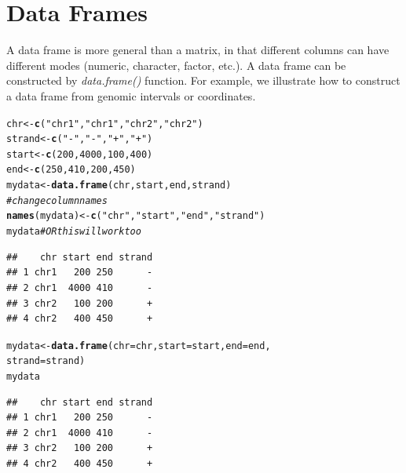 \documentclass[english,nohyper]{tufte-book}\usepackage[]{graphicx}\usepackage[]{color}
\makeatletter
\newcommand{\hlnum}[1]{\textcolor[rgb]{0.686,0.059,0.569}{#1}}%
\newcommand{\hlstr}[1]{\textcolor[rgb]{0.192,0.494,0.8}{#1}}%
\newcommand{\hlcom}[1]{\textcolor[rgb]{0.678,0.584,0.686}{\textit{#1}}}%
\newcommand{\hlstd}[1]{\textcolor[rgb]{0.345,0.345,0.345}{#1}}%
\newcommand{\hlkwb}[1]{\textcolor[rgb]{0.69,0.353,0.396}{#1}}%
\newcommand{\hlkwc}[1]{\textcolor[rgb]{0.333,0.667,0.333}{#1}}%
\newcommand{\hlkwd}[1]{\textcolor[rgb]{0.737,0.353,0.396}{\textbf{#1}}}%
\newenvironment{kframe}{%
 \def\at@end@of@kframe{}%
 \ifinner\ifhmode%
  \def\at@end@of@kframe{\end{minipage}}%
  \begin{minipage}{\columnwidth}%
 \fi\fi%
 \def\FrameCommand##1{\hskip\@totalleftmargin \hskip-\fboxsep
 \colorbox{shadecolor}{##1}\hskip-\fboxsep
     \hskip-\linewidth \hskip-\@totalleftmargin \hskip\columnwidth}%
 \MakeFramed {\advance\hsize-\width
   \@totalleftmargin\z@ \linewidth\hsize
   \@setminipage}}%
 {\par\unskip\endMakeFramed%
 \at@end@of@kframe}
\newenvironment{knitrout}{}{} %
\makeatother
\begin{document}
\section{Data Frames}

A data frame is more general than a matrix, in that different columns
can have different modes (numeric, character, factor, etc.). A data
frame can be constructed by \emph{data.frame()} function. For example,
we illustrate how to construct a data frame from genomic intervals
or coordinates.

\begin{knitrout}
\color{fgcolor}\begin{kframe}
\begin{alltt}
\hlstd{chr} \hlkwb{<-} \hlkwd{c}\hlstd{(}\hlstr{"chr1"}\hlstd{,} \hlstr{"chr1"}\hlstd{,} \hlstr{"chr2"}\hlstd{,} \hlstr{"chr2"}\hlstd{)}
\hlstd{strand} \hlkwb{<-} \hlkwd{c}\hlstd{(}\hlstr{"-"}\hlstd{,} \hlstr{"-"}\hlstd{,} \hlstr{"+"}\hlstd{,} \hlstr{"+"}\hlstd{)}
\hlstd{start} \hlkwb{<-} \hlkwd{c}\hlstd{(}\hlnum{200}\hlstd{,} \hlnum{4000}\hlstd{,} \hlnum{100}\hlstd{,} \hlnum{400}\hlstd{)}
\hlstd{end} \hlkwb{<-} \hlkwd{c}\hlstd{(}\hlnum{250}\hlstd{,} \hlnum{410}\hlstd{,} \hlnum{200}\hlstd{,} \hlnum{450}\hlstd{)}
\hlstd{mydata} \hlkwb{<-} \hlkwd{data.frame}\hlstd{(chr, start, end, strand)}
\hlcom{# change column names}
\hlkwd{names}\hlstd{(mydata)} \hlkwb{<-} \hlkwd{c}\hlstd{(}\hlstr{"chr"}\hlstd{,} \hlstr{"start"}\hlstd{,} \hlstr{"end"}\hlstd{,} \hlstr{"strand"}\hlstd{)}
\hlstd{mydata}  \hlcom{# OR this will work too }
\end{alltt}
\begin{verbatim}
##    chr start end strand
## 1 chr1   200 250      -
## 2 chr1  4000 410      -
## 3 chr2   100 200      +
## 4 chr2   400 450      +
\end{verbatim}
\begin{alltt}
\hlstd{mydata} \hlkwb{<-} \hlkwd{data.frame}\hlstd{(}\hlkwc{chr} \hlstd{= chr,} \hlkwc{start} \hlstd{= start,} \hlkwc{end} \hlstd{= end,}
    \hlkwc{strand} \hlstd{= strand)}
\hlstd{mydata}
\end{alltt}
\begin{verbatim}
##    chr start end strand
## 1 chr1   200 250      -
## 2 chr1  4000 410      -
## 3 chr2   100 200      +
## 4 chr2   400 450      +
\end{verbatim}
\end{kframe}
\end{knitrout}
\end{document}
